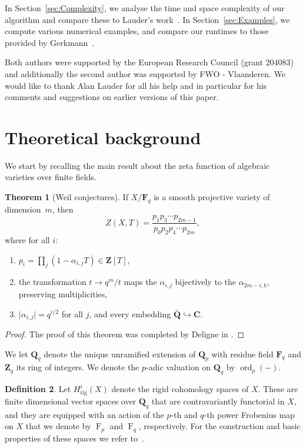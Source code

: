 \documentclass[a4paper,11pt]{article}
\numberwithin{equation}{section}
\providecommand{\abs}[1]{\lvert#1\rvert}                 %
\newcommand{\ZZ}{\mathbf{Z}} %
\newcommand{\QQ}{\mathbf{Q}} %
\newcommand{\CC}{\mathbf{C}} %
\newcommand{\FF}{\mathbf{F}} %
\DeclareMathOperator{\ord}{ord}          %
\DeclareMathOperator{\Frob}{F}           %
\providecommand{\Hrig}{H_{\text{rig}}}  %
\theoremstyle{definition}
\newtheorem{thm}{Theorem}[section]
\newtheorem{defn}[thm]{Definition}
\begin{document}
In Section~\ref{sec:Complexity}, we analyse the time and space complexity of 
our algorithm and compare these to Lauder's work~\citep{Lauder2004a}. 
In Section~\ref{sec:Examples}, we compute various numerical examples, and 
compare our runtimes to those provided by Gerkmann~\citep{Gerkmann2007}. 

Both authors were supported by the European Research Council (grant 204083)
and additionally the second author was supported by FWO - Vlaanderen. We would 
like to thank Alan Lauder for all his help and in particular for his comments and
suggestions on earlier versions of this paper.


\section{Theoretical background}
\label{sec:Background}

We start by recalling the main result about the zeta function of algebraic
varieties over finite fields.

\begin{thm}[Weil conjectures] If $X/\FF_q$ is a smooth projective variety of 
dimension~$m$, then \label{thm:weildeligne}
\[
Z(X,T)=\frac{p_1 p_3 \dotsm p_{2m-1}}{p_0 p_2 p_4 \dotsm p_{2m}},
\]
where for all $i$:
\begin{enumerate}
\item $p_i = \prod_j (1-\alpha_{i,j}T) \in \ZZ[T]$, 
\item the transformation $t \rightarrow q^m/t$ maps the $\alpha_{i,j}$ 
      bijectively to the $\alpha_{2m-i,k}$, preserving multiplicities,
\item $\abs{\alpha_{i,j}} = q^{i/2}$ for all $j$, and every embedding 
      $\bar{\QQ} \hookrightarrow \CC$. 
\end{enumerate}
\end{thm}

\begin{proof}
The proof of this theorem was completed by Deligne in \citep{Deligne1974}.
\end{proof}

We let $\QQ_q$ denote the unique unramified extension of $\QQ_p$ with 
residue field $\FF_q$ and $\ZZ_q$ its ring of integers. We denote
the $p$-adic valuation on $\QQ_q$ by $\ord_p(-)$. 

\begin{defn}
Let $\Hrig^{i}(X)$ denote the rigid
cohomology spaces of $X$. These are finite dimensional vector spaces 
over $\QQ_q$ that are contravariantly functorial in $X$, and they are 
equipped with an action of the $p$-th and $q$-th power Frobenius map 
on $X$ that we denote by $\Frob_p$ and $\Frob_q$, respectively. For the 
construction and basic properties of these spaces we refer 
to~\citep{Berthelot1986}.
\end{defn}
\end{document}
